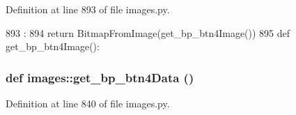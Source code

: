 Definition at line 893 of file images.py.


\begin{DoxyCode}
893                        :
894     return BitmapFromImage(get_bp_btn4Image())
895 
def get_bp_btn4Image():
\end{DoxyCode}
\hypertarget{namespaceimages_aed1b918372f0dd263496d5b64aa18e2a}{
\subsubsection[{get\_\-bp\_\-btn4Data}]{\setlength{\rightskip}{0pt plus 5cm}def images::get\_\-bp\_\-btn4Data ()}}
\label{namespaceimages_aed1b918372f0dd263496d5b64aa18e2a}


Definition at line 840 of file images.py.



